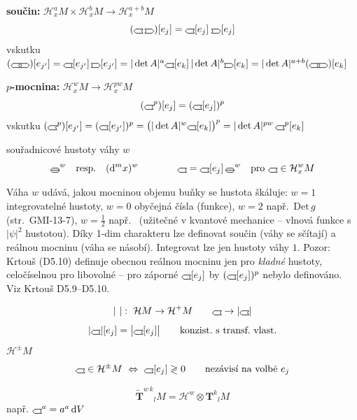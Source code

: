 \textbf{součin:} \quad $\mathcal{H}^a_xM\times\mathcal{H}^b_xM \to \mathcal{H}^{a+b}_xM$
\[
  (\gmIhustsym\,\gmIhustsymB)[e_j] = \gmIhustsym[e_j]\;\gmIhustsymB[e_j]
\]
\quad vskutku \quad
$(\gmIhustsym\gmIhustsymB)[e_{j'}] = \gmIhustsym[e_{j'}]\,\gmIhustsymB[e_{j'}]
 = |\det A|^a\gmIhustsym[e_k]\,|\det A|^b\gmIhustsymB[e_k] = |\det A|^{a+b}(\gmIhustsym\gmIhustsymB)[e_k]$

\textbf{$p$-mocnina:} \quad $\mathcal{H}^w_xM \to \mathcal{H}^{pw}_xM$
\[
  (\gmIhustsym^p)[e_j] = (\gmIhustsym[e_j])^p
\]
\quad vskutku \quad
$(\gmIhustsym^p)[e_{j'}] = (\gmIhustsym[e_{j'}])^p = \big(|\det A|^w\gmIhustsym[e_k]\big)^p = |\det A|^{pw}\,\gmIhustsym^p[e_k]$

souřadnicové hustoty váhy $w$
\[
  \gmIbazhust^w \quad\text{resp.}\quad (\dd^m x)^w
  \qquad\qquad
  \gmIhustsym = \gmIhustsym[e_j]\,\gmIbazhust^w \quad\text{pro } \gmIhustsym\in\mathcal{H}^w_xM
\]

\begin{vysvetleni}
Váha $w$ udává, jakou mocninou objemu buňky se hustota škáluje: $w=1$ integrovatelné hustoty, $w=0$ obyčejná čísla (funkce),
$w=2$ např.\ $\mathrm{Det}\,g$ (str.~GMI-13-7), $w=\frac12$ např.\  (užitečné v kvantové mechanice -- vlnová funkce
s $|\psi|^2$ hustotou). Díky 1-dim charakteru lze definovat součin (váhy se sčítají) a reálnou mocninu (váha se násobí).
Integrovat lze jen hustoty váhy $1$. Pozor: Krtouš (D5.10) definuje obecnou reálnou mocninu jen pro \emph{kladné} hustoty,
celočíselnou pro libovolné -- pro záporné $\gmIhustsym[e_j]$ by $(\gmIhustsym[e_j])^p$ nebylo definováno. Viz Krtouš D5.9--D5.10.
\end{vysvetleni}

\begin{definice}
\[
  |\ |:\ \mathcal{H}M \to \mathcal{H}^+M \qquad \gmIhustsym \to |\gmIhustsym|
\]
\[
  |\gmIhustsym|[e_j] = \big|\gmIhustsym[e_j]\big| \qquad\text{konzist.\ s transf.\ vlast.}
\]
$\mathcal{H}^\pm M$ \quad {}
\[
  \gmIhustsym\in\mathcal{H}^\pm M \ \Leftrightarrow\ \gmIhustsym[e_j] \gtrless 0 \qquad\text{nezávisí na volbě } e_j
\]
\end{definice}

\begin{definice}
\[
  \tilde{\mathbf{T}}^{w\,k}{}_l M = \mathcal{H}^w\otimes\mathbf{T}^k{}_l M
\]
např. \quad $\gmIhustsym^a = a^a\,\dd V$ \quad {}
\end{definice}

